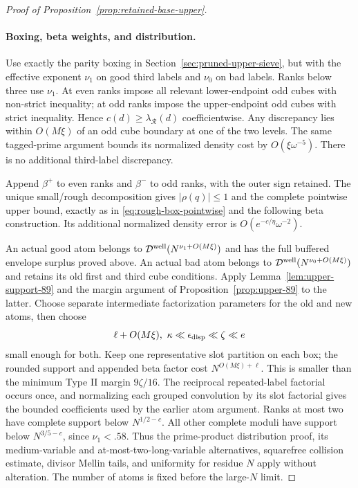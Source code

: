 \documentclass[11pt]{article}
\begin{document}
\begin{proof}[Proof of Proposition~\ref{prop:retained-base-upper}]
\paragraph{Boxing, beta weights, and distribution.}
Use exactly the parity boxing in Section~\ref{sec:pruned-upper-sieve},
but with the effective exponent $\nu_1$ on good third labels and
$\nu_0$ on bad labels. Ranks below three use $\nu_1$.
At even ranks impose all relevant lower-endpoint odd cubes with
non-strict inequality; at odd ranks impose the upper-endpoint
odd cubes with strict inequality. Hence $c(d)\ge\lambda_{\mathcal R}(d)$
coefficientwise. Any discrepancy lies within $O(M\xi)$ of an odd
cube boundary at one of the two levels. The same tagged-prime
argument bounds its normalized density cost by $O(\xi\omega^{-5})$.
There is no additional third-label discrepancy.

Append $\beta^+$ to even ranks and $\beta^-$ to odd ranks, with
the outer sign retained. The unique small/rough decomposition gives
$|\rho(q)|\le1$ and the complete pointwise upper bound, exactly as
in \eqref{eq:rough-box-pointwise} and the following beta construction.
Its additional normalized density error is
$O(e^{-c/\eta}\omega^{-2})$.

An actual good atom belongs to
$\mathcal D^{\rm well}(N^{\nu_1+O(M\xi)})$ and has the full
buffered envelope surplus proved above. An actual bad atom belongs
to $\mathcal D^{\rm well}(N^{\nu_0+O(M\xi)})$ and retains its
old first and third cube conditions. Apply
Lemma~\ref{lem:upper-support-89} and the margin argument of
Proposition~\ref{prop:upper-89} to the latter. Choose separate
intermediate factorization parameters for the old and new atoms,
then choose
\[
 \ell+O(M\xi),\ \kappa\ll\epsilon_{\rm disp}\ll\zeta\ll e
\]
small enough for both. Keep one representative slot partition on
each box; the rounded support and appended beta factor cost
$N^{O(M\xi)+\ell}$. This is smaller than the minimum Type II
margin $9\zeta/16$. The reciprocal repeated-label factorial occurs
once, and normalizing each grouped convolution by its slot factorial
gives the bounded coefficients used by the earlier atom argument.
Ranks at most two have complete support below $N^{1/2-c}$.
All other complete moduli have support below $N^{3/5-c}$, since
$\nu_1<.58$. Thus the prime-product distribution proof, its
medium-variable and at-most-two-long-variable alternatives,
squarefree collision estimate, divisor Mellin tails, and uniformity
for residue $N$ apply without alteration. The number of atoms is
fixed before the large-$N$ limit.


\end{proof}
\end{document}
